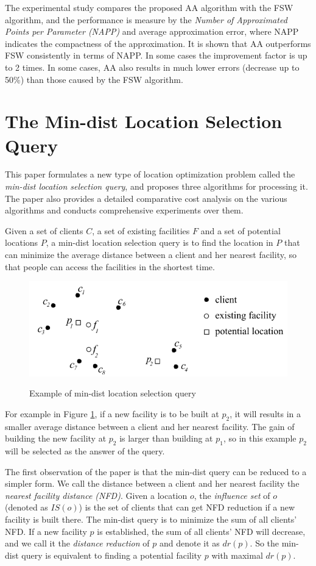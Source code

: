 \documentclass[paper=a4, fontsize=18pt]{article} %
\numberwithin{equation}{section} %
\numberwithin{figure}{section} %
\numberwithin{table}{section} %
\begin{document}
The experimental study compares the proposed AA algorithm with the FSW algorithm, and the performance is measure by the \emph{Number of Approximated Points per Parameter (NAPP)} and average approximation error, where NAPP indicates the compactness of the approximation. It is shown that AA outperforms FSW consistently in terms of NAPP. In some cases the improvement factor is up to 2 times. In some cases, AA also results in much lower errors (decrease up to 50\%) than those caused by the FSW algorithm.

\section{The Min-dist Location Selection Query \cite{QZKLX12}}

This paper formulates a new type of location optimization problem called the \emph{min-dist location selection query}, and proposes three algorithms for processing it. The paper also provides a detailed comparative cost analysis on the various algorithms and conducts comprehensive experiments over them.

Given a set of clients $C$, a set of existing facilities $F$ and a set of potential locations $P$, a min-dist location selection query is to find the location in $P$ that can minimize the average distance between a client and her nearest facility, so that people can access the facilities in the shortest time.

\begin{figure}[h]
  \centering
  \includegraphics[width=.6\linewidth]{7_11_mindist.png}\\
  \caption{Example of min-dist location selection query}\label{fig:mindist}
\end{figure}


For example in Figure \ref{fig:mindist}, if a new facility is to be built at $p_2$, it will results in a smaller average distance between a client and her nearest facility. The gain of building the new facility at $p_2$ is larger than building at $p_1$, so in this example $p_2$ will be selected as the answer of the query.

The first observation of the paper is that the min-dist query can be reduced to a simpler form. We call the distance between a client and her nearest facility the \emph{nearest facility distance (NFD)}. Given a location $o$, the \emph{influence set} of $o$ (denoted as $IS(o)$) is the set of clients that can get NFD reduction if a new facility is built there. The min-dist query is to minimize the sum of all clients' NFD. If a new facility $p$ is established, the sum of all clients' NFD will decrease, and we call it the \emph{distance reduction} of $p$ and denote it as $dr(p)$. So the min-dist query is equivalent to finding a potential facility $p$ with maximal $dr(p)$.
\end{document}
